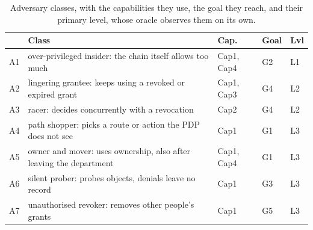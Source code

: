 \documentclass[sigconf,review,anonymous]{acmart}
\begin{document}
\begin{table}[t]
\caption{Adversary classes, with the capabilities they use, the goal they reach, and their primary level, whose
oracle observes them on its own.}
\label{tab:adv}
\small
\begin{tabularx}{\columnwidth}{@{}l@{\;}X@{\;}l@{\;}l@{\;}l@{}}
\toprule
 & Class & Cap. & Goal & Lvl \\
\midrule
A1 & over-privileged insider: the chain itself allows too much & Cap1, Cap4 & G2 & L1 \\
A2 & lingering grantee: keeps using a revoked or expired grant & Cap1, Cap3 & G4 & L2 \\
A3 & racer: decides concurrently with a revocation & Cap2 & G4 & L2 \\
A4 & path shopper: picks a route or action the PDP does not see & Cap1 & G1 & L3 \\
A5 & owner and mover: uses ownership, also after leaving the department & Cap1, Cap4 & G1 & L3 \\
A6 & silent prober: probes objects, denials leave no record & Cap1 & G3 & L3 \\
A7 & unauthorised revoker: removes other people's grants & Cap1 & G5 & L3 \\
\bottomrule
\end{tabularx}
\end{table}
\end{document}
